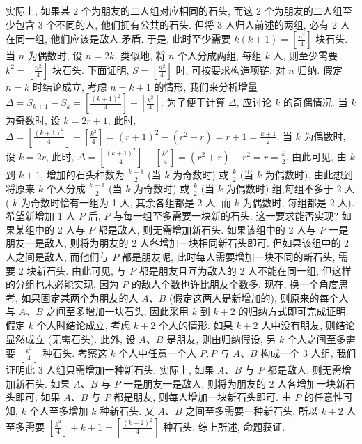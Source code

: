 实际上, 如果某 2 个为朋友的二人组对应相同的石头, 而这 2 个为朋友的二人组至少包含 3 个不同的人, 他们拥有公共的石头.
但将 3 人归人前述的两组, 必有 2 人在同一组, 他们应该是敌人,矛盾.
于是, 此时至少需要 $k(k+1)=\left[\frac{n^2}{4}\right]$ 块石头.
当 $n$ 为偶数时, 设 $n=2 k$, 类似地, 将 $n$ 个人分成两组, 每组 $k$ 人, 则至少需要 $k^2=\left[\frac{n^2}{4}\right]$ 块石头.
下面证明, $S=\left[\frac{n^2}{4}\right]$ 时, 可按要求构造项链.
对 $n$ 归纳.
假定 $n=k$ 时结论成立, 考虑 $n=k+1$ 的情形, 我们来分析增量 $\Delta=S_{k+1}-S_k=\left[\frac{(k+1)^2}{4}\right]-\left[\frac{k^2}{4}\right]$. 为了便于计算 $\Delta$, 应讨论 $k$ 的奇偶情况.
当 $k$ 为奇数时, 设 $k=2 r+1$, 此时, $\Delta=\left[\frac{(k+1)^2}{4}\right]-\left[\frac{k^2}{4}\right]=(r+ 1)^2-\left(r^2+r\right)=r+1=\frac{k+1}{2}$. 当 $k$ 为偶数时, 设 $k=2 r$, 此时, $\Delta= \left[\frac{(k+1)^2}{4}\right]-\left[\frac{k^2}{4}\right]=\left(r^2+r\right)-r^2=r=\frac{k}{2}$. 由此可见, 由 $k$ 到 $k+1$, 增加的石头种数为 $\frac{k+1}{2}$ (当 $k$ 为奇数时) 或 $\frac{k}{2}$ (当 $k$ 为偶数时). 由此想到将原来 $k$ 个人分成 $\frac{k+1}{2}$ (当 $k$ 为奇数时) 或 $\frac{k}{2}$ (当 $k$ 为偶数时) 组,每组不多于 2 人 ( $k$ 为奇数时恰有一组为 1 人, 其余各组都是 2 人, 而 $k$ 为偶数时, 每组都是 2 人). 希望新增加 1 人 $P$ 后, $P$ 与每一组至多需要一块新的石头.
这一要求能否实现? 如果某组中的 2 人与 $P$ 都是敌人, 则无需增加新石头.
如果该组中的 2 人与 $P$ 一是朋友一是敌人, 则将为朋友的 2 人各增加一块相同新石头即可.
但如果该组中的 2 人之间是敌人, 而他们与 $P$ 都是朋友呢, 此时每人需要增加一块不同的新石头, 需要 2 块新石头.
由此可见, 与 $P$ 都是朋友且互为敌人的 2 人不能在同一组, 但这样的分组也未必能实现, 因为 $P$ 的敌人个数也许比朋友个数多.
现在, 换一个角度思考, 如果固定某两个为朋友的人 $A 、 B$ (假定这两人是新增加的), 则原来的每个人与 $A 、 B$ 之间至多增加一块石头, 因此采用 $k$ 到 $k+2$ 的归纳方式即可完成证明.
假定 $k$ 个人时结论成立, 考虑 $k+2$ 个人的情形.
如果 $k+2$ 人中没有朋友, 则结论显然成立 (无需石头). 此外, 设 $A 、 B$ 是朋友, 则由归纳假设, 另 $k$ 个人之间至多需要 $\left[\frac{k^2}{4}\right]$ 种石头.
考察这 $k$ 个人中任意一个人 $P, P$ 与 $A 、 B$ 构成一个 3 人组, 我们证明此 3 人组只需增加一种新石头.
实际上, 如果 $A 、 B$ 与 $P$ 都是敌人, 则无需增加新石头.
如果 $A 、 B$ 与 $P$ 一是朋友一是敌人, 则将为朋友的 2 人各增加一块新石头即可.
如果 $A 、 B$ 与 $P$ 都是朋友, 则每人增加一块新石头即可.
由 $P$ 的任意性可知, $k$ 个人至多增加 $k$ 种新石头.
又 $A 、 B$ 之间至多需要一种新石头, 所以 $k+2$ 人至多需要 $\left[\frac{k^2}{4}\right]+ k+1=\left[\frac{(k+2)^2}{4}\right]$ 种石头.
综上所述, 命题获证.



